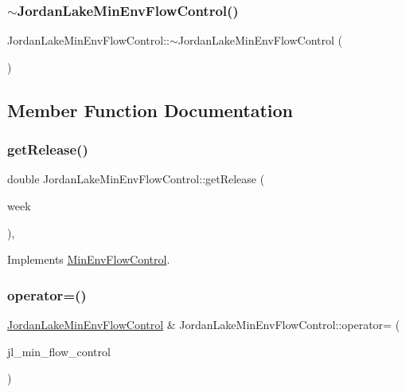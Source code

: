 \subsubsection{\texorpdfstring{$\sim$\+Jordan\+Lake\+Min\+Env\+Flow\+Control()}{~JordanLakeMinEnvFlowControl()}}
{\footnotesize\ttfamily Jordan\+Lake\+Min\+Env\+Flow\+Control\+::$\sim$\+Jordan\+Lake\+Min\+Env\+Flow\+Control (\begin{DoxyParamCaption}{ }\end{DoxyParamCaption})\hspace{0.3cm}{\ttfamily [override]}}



\subsection{Member Function Documentation}
\mbox{\label{classJordanLakeMinEnvFlowControl_a5c2456c26fa141824c247cd15bf5c57d}} 
\subsubsection{\texorpdfstring{get\+Release()}{getRelease()}}
{\footnotesize\ttfamily double Jordan\+Lake\+Min\+Env\+Flow\+Control\+::get\+Release (\begin{DoxyParamCaption}\item[{int}]{week }\end{DoxyParamCaption})\hspace{0.3cm}{\ttfamily [override]}, {\ttfamily [virtual]}}



Implements \mbox{\hyperlink{classMinEnvFlowControl_a5de79615852eb0c937dd559a9eb9402d}{Min\+Env\+Flow\+Control}}.

\mbox{\label{classJordanLakeMinEnvFlowControl_a939dc49f5e9a80a2f9a3c9c6bdce98fb}} 
\subsubsection{\texorpdfstring{operator=()}{operator=()}}
{\footnotesize\ttfamily \mbox{\hyperlink{classJordanLakeMinEnvFlowControl}{Jordan\+Lake\+Min\+Env\+Flow\+Control}} \& Jordan\+Lake\+Min\+Env\+Flow\+Control\+::operator= (\begin{DoxyParamCaption}\item[{const \mbox{\hyperlink{classJordanLakeMinEnvFlowControl}{Jordan\+Lake\+Min\+Env\+Flow\+Control}} \&}]{jl\+\_\+min\+\_\+flow\+\_\+control }\end{DoxyParamCaption})}

